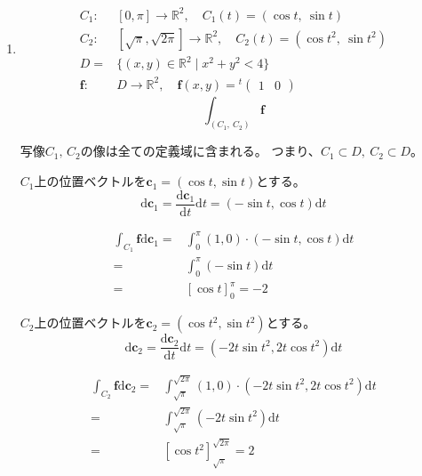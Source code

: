 \documentclass[12pt,b5paper]{ltjsarticle}
\begin{document}
\begin{enumerate}
\begin{enumerate}
       \end{enumerate}

       \hrulefill
 \item
      \begin{align}
       C_1:& \left[0,\pi\right]\to \mathbb{R}^2 ,  \quad C_1(t)=(\cos{t},\ \sin{t})\\
       C_2:& \left[\sqrt{\pi},\sqrt{2\pi}\right]\to \mathbb{R}^2 ,  \quad C_2(t)=(\cos{t^2},\ \sin{t^2})\\
       D=& \{ (x,y)\in\mathbb{R}^2 \mid x^2 + y^2 <4 \}\\
       \bm{f}:& D\to \mathbb{R}^2 ,  \quad \bm{f}(x,y)={}^{t}\begin{pmatrix}1 & 0\end{pmatrix}
      \end{align}
      \begin{equation}
       \int_{(C_1,\ C_2)} \bm{f} %
      \end{equation}

      \dotfill

      写像$C_1,\,C_2$の像は全ての定義域に含まれる。
      つまり、$C_1 \subset D,\ C_2 \subset D$。

      $C_1$上の位置ベクトルを$\bm{c}_1=(\cos t, \sin t)$とする。
      \begin{equation}
       \mathrm{d}\bm{c}_1 =
       \frac{\mathrm{d}\bm{c}_1}{\mathrm{d}t}\mathrm{d}t
        = (-\sin t, \cos t) \mathrm{d}t
      \end{equation}

      \begin{align}
       \int_{C_1}\bm{f}\mathrm{d}\bm{c}_1
       =& \int_{0}^{\pi}(1,0)\cdot (-\sin t, \cos t) \mathrm{d}t\\
       =& \int_{0}^{\pi}(-\sin t) \mathrm{d}t\\
       =& \left[\cos t \right]_{0}^{\pi}
       = -2
      \end{align}

      $C_2$上の位置ベクトルを$\bm{c}_2=(\cos t^2, \sin t^2)$とする。
      \begin{equation}
       \mathrm{d}\bm{c}_2 =
       \frac{\mathrm{d}\bm{c}_2}{\mathrm{d}t}\mathrm{d}t
        = (-2t\sin t^2, 2t\cos t^2) \mathrm{d}t
      \end{equation}

      \begin{align}
       \int_{C_2}\bm{f}\mathrm{d}\bm{c}_2
       =& \int_{\sqrt{\pi}}^{\sqrt{2\pi}}(1,0)\cdot (-2t\sin t^2, 2t\cos t^2) \mathrm{d}t\\
       =& \int_{\sqrt{\pi}}^{\sqrt{2\pi}} (-2t\sin t^2) \mathrm{d}t\\
       =& \left[ \cos t^2\right]_{\sqrt{\pi}}^{\sqrt{2\pi}} = 2
      \end{align}


\end{enumerate}
\end{document}
